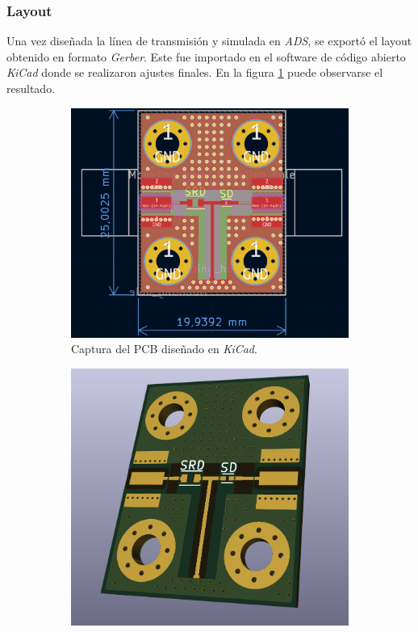 \subsubsection{Layout}

Una vez diseñada la línea de transmisión y simulada en \textit{ADS}, se exportó
el layout obtenido en formato \textit{Gerber}. Este fue importado en el software
de código abierto \textit{KiCad} donde se realizaron ajustes finales. En la
figura \ref{fig:pulser_layout} puede observarse el resultado.

\begin{figure}
    \centering

    \begin{subfigure}[b]{0.45\textwidth}
        \includegraphics[width=\textwidth]{images/pulser_layout.png}
        \caption{Captura del PCB diseñado en \textit{KiCad}.}
        \label{fig:pulser_layout}
    \end{subfigure}
    \hfill
    \begin{subfigure}[b]{0.45\textwidth}
        \includegraphics[width=\textwidth]{images/pulser_3d.png}

\end{subfigure}
\end{figure}
